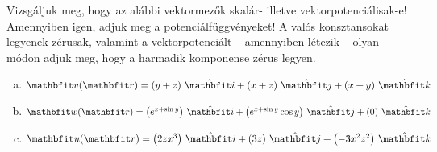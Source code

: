 \documentclass[exercise]{math-standalone}
\begin{document}
\begin{exercise}{%
    Vizsgáljuk meg, hogy az alábbi vektormezők skalár- illetve
    vektorpotenciálisak-e! Amennyiben igen, adjuk meg a potenciálfüggvényeket!
    A valós konsztansokat legyenek zérusak, valamint a vektorpotenciált --
    amennyiben létezik -- olyan módon adjuk meg, hogy a harmadik komponense
    zérus legyen.
  }
  \begin{enumerate}[a)]
    \item $\rvec v(\rvec r) = \ijk{y + z}{x + z}{x + y}$
    \item $\rvec w(\rvec r) = \ijk{e^{x + \sin y}}{e^{x + \sin y} \cos y}{0}$
    \item $\rvec u(\rvec r) = \ijk{2zx^3}{3z}{-3x^2z^2}$
  \end{enumerate}

\end{exercise}
\end{document}
